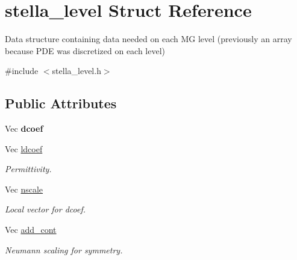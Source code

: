 \hypertarget{structstella__level}{}\section{stella\+\_\+level Struct Reference}
\label{structstella__level}


Data structure containing data needed on each MG level (previously an array because P\+DE was discretized on each level)  




{\ttfamily \#include $<$stella\+\_\+level.\+h$>$}

\subsection*{Public Attributes}
\begin{DoxyCompactItemize}
\item 
\mbox{\label{structstella__level_aaa318f6ecfb6e08c4456cebb0313f62f}} 
Vec {\bfseries dcoef}
\item 
\mbox{\label{structstella__level_a6e9c8a6d2efc75b6c0ef465efa8852c3}} 
Vec \mbox{\hyperlink{structstella__level_a6e9c8a6d2efc75b6c0ef465efa8852c3}{ldcoef}}
\begin{DoxyCompactList}\small\item\em Permittivity. \end{DoxyCompactList}\item 
\mbox{\label{structstella__level_ab071c1ffcf3f85e82f3074e7f19de16f}} 
Vec \mbox{\hyperlink{structstella__level_ab071c1ffcf3f85e82f3074e7f19de16f}{nscale}}
\begin{DoxyCompactList}\small\item\em Local vector for dcoef. \end{DoxyCompactList}\item 
\mbox{\label{structstella__level_a13d222e51aeebee890e03a212e5da952}} 
Vec \mbox{\hyperlink{structstella__level_a13d222e51aeebee890e03a212e5da952}{add\+\_\+cont}}
\begin{DoxyCompactList}\small\item\em Neumann scaling for symmetry. \end{DoxyCompactList}\item 
\mbox{\label{structstella__level_ab0497b48a8d021c80b5ed9edede17762}} 

\end{DoxyCompactItemize}
